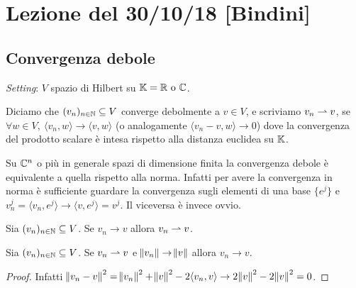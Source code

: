 \section{Lezione del 30/10/18 [Bindini]}

\subsection{Convergenza debole}
\emph{Setting}: $ V $ spazio di Hilbert su $ \mathbb{K} = \mathbb{R} \text{ o } \mathbb{C} $.

\begin{definition}
    Diciamo che $ (v_n)_{n \in \mathbb{N}} \subseteq V $ converge debolmente a $ v \in V $, e scriviamo $ v_n \rightharpoonup v $, se $ \forall w \in V, \ {\langle v_n, w \rangle} \to {\langle v, w \rangle} $ (o analogamente $ {\langle v_n - v, w \rangle} \to 0 $) dove la convergenza del prodotto scalare è intesa rispetto alla distanza euclidea su $ \mathbb{K} $. 
\end{definition}

\begin{oss}
    Su $ \mathbb{C}^n $ o più in generale spazi di dimensione finita la convergenza debole è equivalente a quella rispetto alla norma. Infatti per avere la convergenza in norma è sufficiente guardare la convergenza sugli elementi di una base $ \{e^j\} $ e $ v_n^j = {\langle v_n, e^j\rangle} \to {\langle v, e^j\rangle} = v^j $. Il viceversa è invece ovvio.
\end{oss}

\begin{lemma}
    Sia $ (v_n)_{n \in \mathbb{N}} \subseteq V $. Se $ v_n \to v $ allora $ v_n \rightharpoonup v $.
\end{lemma}

\begin{lemma}
    Sia $ (v_n)_{n \in \mathbb{N}} \subseteq V $. Se $ v_n \rightharpoonup v $ e $ \norm{v_n} \to \norm{v} $ allora $ v_n \to v $.
\end{lemma}
\begin{proof}
    Infatti $ \norm{v_n - v}^2 = \norm{v_n}^2 + \norm{v}^2 - 2 {\langle v_n, v \rangle} \to 2\norm{v}^2 - 2\norm{v}^2 = 0 $.
\end{proof}

